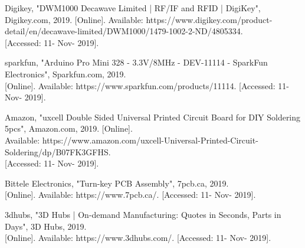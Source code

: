 \begin{enumerate}[label={[\arabic*]}, leftmargin=*]
\item Digikey, "DWM1000 Decawave Limited | RF/IF and RFID | DigiKey", Digikey.com, 2019. 
{[Online]}. Available: https://www.digikey.com/product-detail/en/decawave-limited/DWM1000/1479-1002-2-ND/4805334. \\
{[Accessed: 11- Nov- 2019]}.

\item sparkfun, "Arduino Pro Mini 328 - 3.3V/8MHz - DEV-11114 - SparkFun Electronics", Sparkfun.com, 2019. \\
{[Online]}. Available: https://www.sparkfun.com/products/11114. {[Accessed: 11- Nov- 2019]}.\\

\item Amazon, "uxcell Double Sided Universal Printed Circuit Board for DIY Soldering 5pcs", Amazon.com, 2019. {[Online]}. \\
Available: https://www.amazon.com/uxcell-Universal-Printed-Circuit-Soldering/dp/B07FK3GFHS. \\
{[Accessed: 11- Nov- 2019]}.\\

\item Bittele Electronics, "Turn-key PCB Assembly", 7pcb.ca, 2019. \\
{[Online]}. Available: https://www.7pcb.ca/. {[Accessed: 11- Nov- 2019]}.\\

\item 3dhubs, "3D Hubs | On-demand Manufacturing: Quotes in Seconds, Parts in Days", 3D Hubs, 2019. \\
{[Online]}. Available: https://www.3dhubs.com/. {[Accessed: 11- Nov- 2019]}.\\


\end{enumerate}